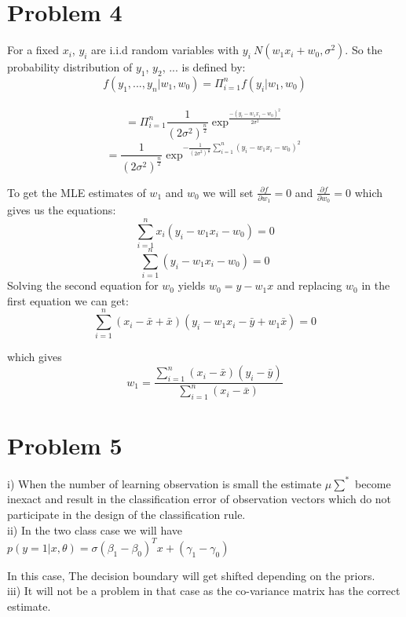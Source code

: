 \documentclass[10pt,onecolumn,letterpaper]{article}
\begin{document}
\section{Problem 4}
For a fixed $x_i$, $y_i$ are i.i.d random variables with $y_i ~ N(w_1x_i +w_0, \sigma^2)$. So the
probability distribution of $y_1$, $y_2$, ... is defined by:\\
$$f(y_1, ..., y_n|w_1,w_0) = \Pi_{i=1}^nf(y_i|w_1,w_0)$$\\
$$= \Pi_{i=1}^n\frac{1}{(2\sigma^2)^{\frac{n}{2}}} \exp^\frac{-(y_i-w_1x_i-w_0)^2}{2\sigma^2}$$
$$= \frac{1}{(2\sigma^2)^{\frac{n}{2}}} \exp^{-\frac{1}{(2\sigma^2)^{\frac{n}{2}}}\sum_{i=1}^n{(y_i-w_1x_i-w_0)^2}}$$

To get the MLE estimates of $w_1$ and $w_0$ we will set $\frac{\partial f}{\partial w_1} = 0$ and $\frac{\partial f}{\partial w_0} = 0$
which gives us the equations:\\
$$
\sum_{i=1}^nx_i(y_i-w_1x_i-w_0)=0
$$
$$
\sum_{i=1}^n(y_i-w_1x_i-w_0)=0
$$
Solving the second equation for $w_0$ yields $w_0 = y - w_1x$ and replacing $w_0$ in the first equation we can get:\\
$$
\sum_{i=1}^n(x_i-\bar{x}+\bar{x})(y_i-w_1x_i-\bar{y}+w_1\bar{x})=0
$$

which gives \\
$$
w_1 = \frac{ \sum_{i=1}^n(x_i-\bar{x})(y_i-\bar{y})}{\sum_{i=1}^n(x_i-\bar{x})}
$$

\section{Problem 5}
i) When  the number of learning observation is small the estimate $\mu\sum^*$ become inexact and result in the classification error of observation vectors which do not participate in the design of the classification rule.\\

ii) In the two class case we will have $p(y=1|x,\theta)= \sigma(\beta_1-\beta_0)^Tx+(\gamma_1-\gamma_0)$

In this case, The decision boundary will get shifted depending on the priors. \\

iii) It will not be a problem in that case as the co-variance matrix has the correct estimate.\\
\\\\\\\\\\\\\\\\\\\\\\\\\\\\\\\\\\\\\\\
\end{document}

